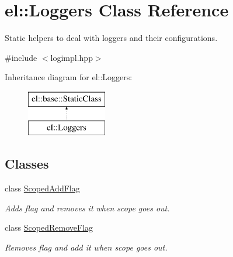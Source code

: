 \hypertarget{classel_1_1Loggers}{\section{el\-:\-:Loggers Class Reference}
\label{classel_1_1Loggers}
}


Static helpers to deal with loggers and their configurations.  




{\ttfamily \#include $<$logimpl.\-hpp$>$}

Inheritance diagram for el\-:\-:Loggers\-:\begin{figure}[H]
\begin{center}
\leavevmode
\includegraphics[height=2.000000cm]{classel_1_1Loggers}
\end{center}
\end{figure}
\subsection*{Classes}
\begin{DoxyCompactItemize}
\item 
class \hyperlink{classel_1_1Loggers_1_1ScopedAddFlag}{Scoped\-Add\-Flag}
\begin{DoxyCompactList}\small\item\em Adds flag and removes it when scope goes out. \end{DoxyCompactList}\item 
class \hyperlink{classel_1_1Loggers_1_1ScopedRemoveFlag}{Scoped\-Remove\-Flag}
\begin{DoxyCompactList}\small\item\em Removes flag and add it when scope goes out. \end{DoxyCompactList}\end{DoxyCompactItemize}
